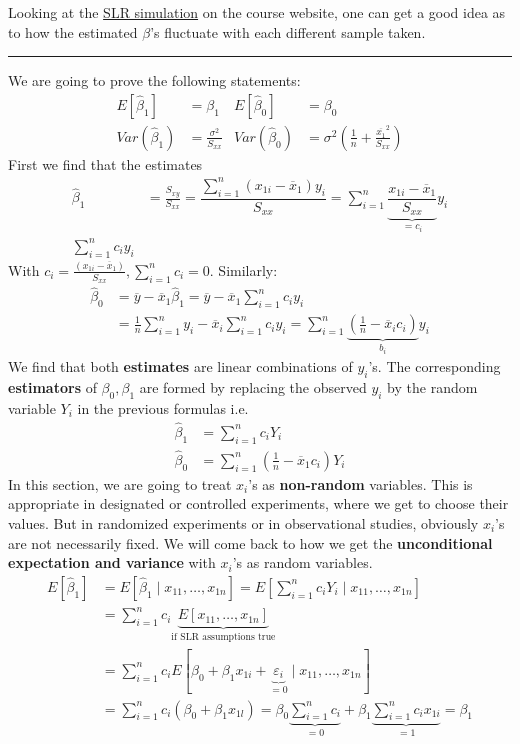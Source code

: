 \documentclass[12 pt]{article}
\begin{document}
Looking at the \href{https://yangyi.shinyapps.io/simulation/}{SLR
  simulation} on the course website, one can get a good idea as to how
the estimated $\beta$'s fluctuate with each different sample taken.
\\ \noindent \rule{\textwidth}{0.5pt}
We are going to prove the following statements:
\begin{align*}
  E[\hat{\beta}_1] & = \beta_1 & E[\hat{\beta}_0] & = \beta_0
  \\ Var(\hat{\beta}_1) & = \frac{\sigma^2}{S_{xx}} & Var(\hat{\beta}_0) & = \sigma^2 \left(\frac{1}{n} + \frac{\overline{x_1}^2}{S_{xx}}\right)
\end{align*}
First we find that the estimates
\begin{align*}
  \hat{\beta}_1 & = \frac{S_{xy}}{S_{xx}} = \dfrac{\sum_{i=1}^n (x_{1i} - \overline{x}_1)y_i}{S_{xx}} = \sum_{i=1}^n \underbrace{\dfrac{x_{1i} - \overline{x}_1}{S_{xx}}}_{= c_i}y_{i}
  \\ \sum_{i=1}^n c_i y_i
\end{align*}
With $c_i = \frac{(x_{1i} - \overline{x}_1)}{S_{xx}}, \sum_{i=1}^n c_i
= 0$. Similarly:
\begin{align*}
  \hat{\beta}_0 & = \overline{y} - \overline{x}_1 \hat{\beta}_1 = \overline{y} - \overline{x}_1 \sum_{i=1}^n c_i y_i
  \\ & = \frac{1}{n} \sum_{i=1}^n y_i - \overline{x}_i \sum_{i=1}^nc_iy_i = \sum_{i=1}^{n} \underbrace{\left(\frac{1}{n} - \overline{x}_i c_i\right)}_{b_i} y_i
\end{align*}
We find that both \textbf{estimates} are linear combinations of
$y_i$'s. The corresponding \textbf{estimators} of $\beta_0, \beta_1$
are formed by replacing the observed $y_i$ by the random variable
$Y_i$ in the previous formulas i.e.\
\begin{align*}
  \hat{\beta}_1 & = \sum_{i=1}^n c_i Y_i
  \\ \hat{\beta}_0 & = \sum_{i=1}^n \left(\frac{1}{n} - \overline{x}_1 c_i\right) Y_i
\end{align*}
In this section, we are going to treat $x_i$'s as \textbf{non-random}
variables. This is appropriate in designated or controlled
experiments, where we get to choose their values. But in randomized
experiments or in observational studies, obviously $x_i$'s are not
necessarily fixed. We will come back to how we get the
\textbf{unconditional expectation and variance} with $x_i$'s as random
variables.
\begin{align*}
  E[\hat{\beta}_1] & = E[\hat{\beta}_1 \mid x_{11}, \ldots, x_{1n}]
                     = E \left[\sum_{i=1}^n c_i Y_i \mid x_{11},\ldots, x_{1n}\right]
  \\ & = \sum_{i=1}^n c_i \underbrace{E \left[x_{11}, \ldots,
       x_{1n}\right]}_{\text{if SLR assumptions true}}
  \\ & = \sum_{i=1}^n c_i E \left[\beta_0 + \beta_1 x_{1i} + \underbrace{\varepsilon_i}_{=0} \mid x_{11}, \ldots, x_{1n}\right]
  \\ & = \sum_{i=1}^n c_i (\beta_0 + \beta_1 x_{1l}) = \beta_0 \underbrace{\sum_{i = 1}^{n}c_i}_{= 0} + \beta_1 \underbrace{\sum_{i=1}^nc_i x_{1i}}_{=1} = \beta_1
\end{align*}
\end{document}

